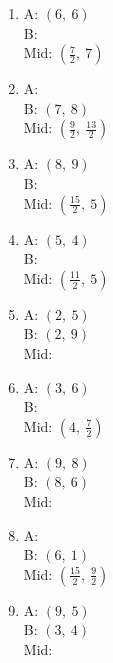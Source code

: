 \documentclass{article}
\begin{document}
\begin{enumerate}
\item A: $\left( 6, \  6\right)$\\B: \underline{\hspace{1cm}}\\Mid: $\left( \frac{7}{2}, \  7\right)$\\ 
\item A: \underline{\hspace{1cm}}\\B: $\left( 7, \  8\right)$\\Mid: $\left( \frac{9}{2}, \  \frac{13}{2}\right)$\\ 
\item A: $\left( 8, \  9\right)$\\B: \underline{\hspace{1cm}}\\Mid: $\left( \frac{15}{2}, \  5\right)$\\ 
\item A: $\left( 5, \  4\right)$\\B: \underline{\hspace{1cm}}\\Mid: $\left( \frac{11}{2}, \  5\right)$\\ 
\item A: $\left( 2, \  5\right)$\\B: $\left( 2, \  9\right)$\\Mid: \underline{\hspace{1cm}}\\ 
\item A: $\left( 3, \  6\right)$\\B: \underline{\hspace{1cm}}\\Mid: $\left( 4, \  \frac{7}{2}\right)$\\ 
\item A: $\left( 9, \  8\right)$\\B: $\left( 8, \  6\right)$\\Mid: \underline{\hspace{1cm}}\\ 
\item A: \underline{\hspace{1cm}}\\B: $\left( 6, \  1\right)$\\Mid: $\left( \frac{15}{2}, \  \frac{9}{2}\right)$\\ 
\item A: $\left( 9, \  5\right)$\\B: $\left( 3, \  4\right)$\\Mid: \underline{\hspace{1cm}}\\ 

\end{enumerate}
\end{document}
